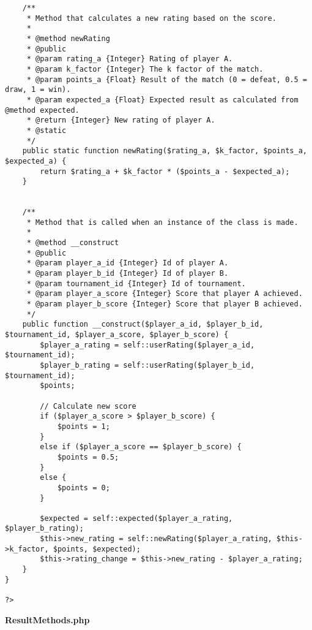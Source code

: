 {\begin{lstlisting}
	/**
	 * Method that calculates a new rating based on the score.
	 *
	 * @method newRating
	 * @public
	 * @param rating_a {Integer} Rating of player A.
	 * @param k_factor {Integer} The k factor of the match.
	 * @param points_a {Float} Result of the match (0 = defeat, 0.5 = draw, 1 = win).
	 * @param expected_a {Float} Expected result as calculated from @method expected.
	 * @return {Integer} New rating of player A.
	 * @static
	 */
	public static function newRating($rating_a, $k_factor, $points_a, $expected_a) {
		return $rating_a + $k_factor * ($points_a - $expected_a);
	}


	/**
	 * Method that is called when an instance of the class is made.
	 *
	 * @method __construct
	 * @public
	 * @param player_a_id {Integer} Id of player A.
	 * @param player_b_id {Integer} Id of player B.
	 * @param tournament_id {Integer} Id of tournament.
	 * @param player_a_score {Integer} Score that player A achieved.
	 * @param player_b_score {Integer} Score that player B achieved.
	 */
	public function __construct($player_a_id, $player_b_id, $tournament_id, $player_a_score, $player_b_score) {
		$player_a_rating = self::userRating($player_a_id, $tournament_id);
		$player_b_rating = self::userRating($player_b_id, $tournament_id);
		$points;

		// Calculate new score
		if ($player_a_score > $player_b_score) {
			$points = 1;
		}
		else if ($player_a_score == $player_b_score) {
			$points = 0.5;
		}
		else {
			$points = 0;
		}

		$expected = self::expected($player_a_rating, $player_b_rating);
		$this->new_rating = self::newRating($player_a_rating, $this->k_factor, $points, $expected);
		$this->rating_change = $this->new_rating - $player_a_rating;
	}
}

?>\end{lstlisting}
}
\textbf{ResultMethods.php}\label{ResultMethods.php}

